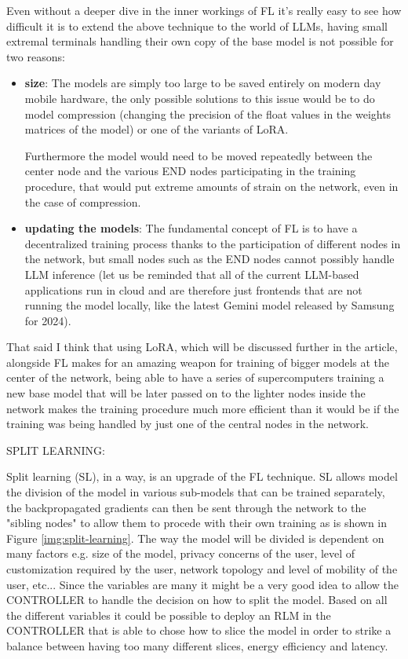 Even without a deeper dive in the inner workings of FL it's really easy to see how difficult it is
to extend the above technique to the world of LLMs, having small extremal terminals handling their
own copy of the base model is not possible for two reasons:
\begin{itemize}
	\item \textbf{size}: The models are simply too large to be saved entirely on modern day
		mobile hardware, the only possible solutions to this issue would be to do model
		compression (changing the precision of the float values in the weights matrices of
		the model) or one of the variants of LoRA.

		Furthermore the model would need to be moved repeatedly between the center node and
		the various END nodes participating in the training procedure, that would put
		extreme amounts of strain on the network, even in the case of compression.
	\item \textbf{updating the models}: The fundamental concept of FL is to have a
		decentralized training process thanks to the participation of different nodes in
		the network, but small nodes such as the END nodes cannot possibly handle LLM
		inference (let us be reminded that all of the current LLM-based applications run in
		cloud and are therefore just frontends that are not running the model locally, like
		the latest Gemini model released by Samsung for 2024).
\end{itemize}
That said I think that using LoRA, which will be discussed further in the article, alongside FL
makes for an amazing weapon for training of bigger models at the center of the network, being able
to have a series of supercomputers training a new base model that will be later passed on to the
lighter nodes inside the network makes the training procedure much more efficient than it would be
if the training was being handled by just one of the central nodes in the network.

\bigskip
\noindent
SPLIT LEARNING:

Split learning (SL), in a way, is an upgrade of the FL technique.
SL allows model the division of the model in various sub-models that can be trained separately, the
backpropagated gradients can then be sent through the network to the "sibling nodes" to allow them
to procede with their own training as is shown in Figure \ref{img:split-learning}.
The way the model will be divided is dependent on many factors e.g. size of the
model, privacy concerns of the user, level of customization required by the user, network topology
and level of mobility of the user, etc...
Since the variables are many it might be a very good idea to allow the CONTROLLER to handle the
decision on how to split the model. Based on all the different variables it could be possible to
deploy an RLM in the CONTROLLER that is able to chose how to slice the model in order to strike a
balance between having too many different slices, energy efficiency and latency.

